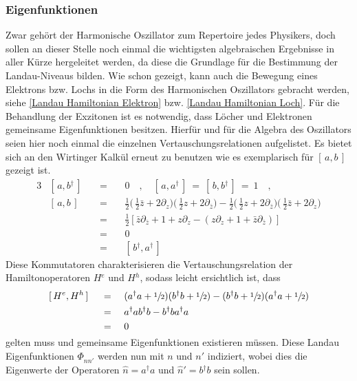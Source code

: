\documentclass[a4paper,11pt, twoside]{article}
\newcommand{\ind}[2]{{_{#1}^{#2}}}
\newcommand{\+}{\dagger}
\newcommand{\com}[2]{[\, #1, #2 \,]}
\renewcommand{\'}{\tt\textquotesingle}
\renewcommand{\it}{\mathit}
\renewcommand{\^}{\hat}
\renewcommand{\~}{\widetilde}
\begin{document}
\subsubsection{Eigenfunktionen}
Zwar gehört der Harmonische Oszillator zum Repertoire jedes Physikers, doch sollen an dieser Stelle noch einmal die wichtigsten algebraischen Ergebnisse in aller Kürze hergeleitet werden, da diese die Grundlage für die Bestimmung der Landau-Niveaus bilden. Wie schon gezeigt, kann auch die Bewegung eines Elektrons bzw. Lochs in die Form des Harmonischen Oszillators gebracht werden, siehe \eqref{Landau Hamiltonian Elektron} bzw. \eqref{Landau Hamiltonian Loch}. Für die Behandlung der Exzitonen ist es notwendig, dass Löcher und Elektronen gemeinsame Eigenfunktionen besitzen. Hierfür und für die Algebra des Oszillators seien hier noch einmal die einzelnen Vertauschungsrelationen aufgelistet. Es bietet sich an den Wirtinger Kalkül erneut zu benutzen wie es exemplarisch für $\com{a}{b}$ gezeigt ist. 
\begin{alignat*}{3}
& \com{a}{b\ind{}{\+}} && \ = \ && 0 \quad , \quad \com{a}{a\ind{}{\+}}\ =\ \com{b}{b\ind{}{\+}}\ =\ 1 \quad ,\\[7pt]
& \com{a}{b} &&\ =\ && \frac{1}{2}\Big(\,\frac{1}{2}\bar z + 2\partial_{z}\Big)\Big(\,\frac{1}{2}z + 2\partial_{\bar z}\Big) -\frac{1}{2}\Big(\,\frac{1}{2}z + 2\partial_{\bar z}\Big)\Big(\,\frac{1}{2}\bar z + 2\partial_{ z}\Big)\\[3pt]
& &&\ =\ && \frac{1}{2}[\bar z \partial_{\bar z}+1 +z\partial_z - (z \partial_{ z}+1 +\bar z\partial_{\bar z})] \\[3pt]
& &&\ =\ && 0 \\
& &&\ =\ && \com{b\ind{}{\+}}{a\ind{}{\+}}
\end{alignat*}
Diese Kommutatoren charakterisieren die Vertauschungsrelation der Hamiltonoperatoren $H\ind{}{e}$ und $H\ind{}{h}$, sodass leicht ersichtlich ist, dass 
\begin{alignat*}{3}
& \com{H\ind{}{e}}{H\ind{}{h}} &&\ =\ && (a\ind{}{\+}a+\sfrac{1}{2})(b\ind{}{\+}b+\sfrac{1}{2})-(b\ind{}{\+}b+\sfrac{1}{2})(a\ind{}{\+}a+\sfrac{1}{2}) \\
& &&\ = \ && a\ind{}{\+}ab\ind{}{\+}b - b\ind{}{\+}ba\ind{}{\+}a \\
& &&\ = \ && 0
\end{alignat*}
gelten muss und gemeinsame Eigenfunktionen existieren müssen. Diese Landau Eigenfunktionen $\it{\Phi}\ind{nn'}{}$ werden nun mit $n$ und $n'$ indiziert, wobei dies die Eigenwerte der Operatoren $\^ n = a\ind{}{\+}a$ und $\^n '= b\ind{}{\+}b $ sein sollen. \\
\end{document}
